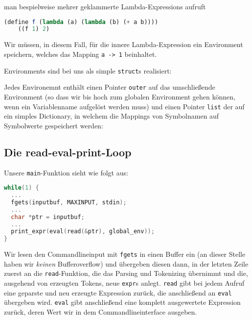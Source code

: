 man bespielweise mehrer geklammerte Lambda-Expressions aufruft
\begin{lstlisting}[language=Scheme]
    (define f (lambda (a) (lambda (b) (+ a b))))
    ((f 1) 2)
\end{lstlisting}
Wir müssen, in diesem Fall, für die innere Lambda-Expression ein Environment
speichern, welches das Mapping \texttt{a -> 1} beinhaltet.
\par
Environments sind bei uns als simple \texttt{struct}s realisiert:

Jedes Environemnt enthält einen Pointer \texttt{outer} auf das umschließende
Environment (so dass wir bis hoch zum globalen Environment gehen können, wenn
ein Variablenname aufgelöst werden muss) und einen Pointer \texttt{list} der
auf ein simples Dictionary, in welchem die Mappings von Symbolnamen auf 
Symbolwerte gespeichert werden:


\subsection[Read-Loop]{Die read-eval-print-Loop}
Unsere \texttt{main}-Funktion sieht wie folgt aus:
\begin{lstlisting}[language=C]
while(1) {
  ...
  fgets(inputbuf, MAXINPUT, stdin);
  ...
  char *ptr = inputbuf;
  ...
  print_expr(eval(read(&ptr), global_env));
}
\end{lstlisting}
Wir lesen den Commandlineinput mit \texttt{fgets} in einen Buffer ein (an dieser
Stelle haben wir \emph{keinen} Bufferoverflow) und übergeben diesen dann, in
der letzten Zeile zuerst an die \texttt{read}-Funktion, die das Parsing und
Tokenizing übernimmt und die, ausgehend von erzeugten Tokens, neue 
\texttt{expr}s anlegt. \texttt{read} gibt bei jedem Aufruf eine geparste und 
neu erzeugte Expression zurück, die anschließend an \texttt{eval} übergeben
wird. \texttt{eval} gibt anschließend eine komplett ausgewertete Expression
zurück, deren Wert wir in dem Commandlineinterface ausgeben.
\par

